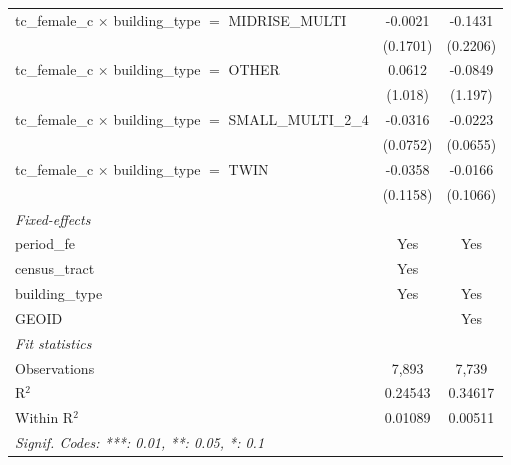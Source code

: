 \begin{tabular}{lcc}
   tc\_female\_c $\times$ building\_type $=$ MIDRISE\_MULTI            & -0.0021        & -0.1431\\   
                                                                       & (0.1701)       & (0.2206)\\   
   tc\_female\_c $\times$ building\_type $=$ OTHER                     & 0.0612         & -0.0849\\   
                                                                       & (1.018)        & (1.197)\\   
   tc\_female\_c $\times$ building\_type $=$ SMALL\_MULTI\_2\_4        & -0.0316        & -0.0223\\   
                                                                       & (0.0752)       & (0.0655)\\   
   tc\_female\_c $\times$ building\_type $=$ TWIN                      & -0.0358        & -0.0166\\   
                                                                       & (0.1158)       & (0.1066)\\   
   \midrule
   \emph{Fixed-effects}\\
   period\_fe                                                          & Yes            & Yes\\  
   census\_tract                                                       & Yes            & \\  
   building\_type                                                      & Yes            & Yes\\  
   GEOID                                                               &                & Yes\\  
   \midrule
   \emph{Fit statistics}\\
   Observations                                                        & 7,893          & 7,739\\  
   R$^2$                                                               & 0.24543        & 0.34617\\  
   Within R$^2$                                                        & 0.01089        & 0.00511\\  
   \midrule \midrule
   \multicolumn{3}{l}{\emph{Signif. Codes: ***: 0.01, **: 0.05, *: 0.1}}\\
\end{tabular}
\par\endgroup
